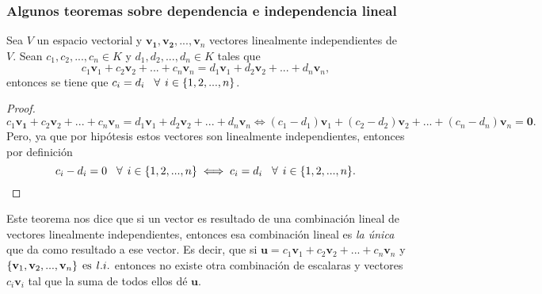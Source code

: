 \documentclass[notasLineal]{subfiles}
\begin{document}
\subsubsection*{Algunos teoremas sobre dependencia e independencia lineal} \label{Teo:Dependencia_e_independencia_lineal} 

\begin{Teo}\label{teo:Unicidad de combinación lineal en independencia lineal}

    Sea $V$ un espacio vectorial y $\mathbf{v_1}, \mathbf{v_2}, ..., \mathbf{v}_n$ vectores linealmente independientes de $V$. Sean $c_1, c_2, ..., c_n\in K$ y $d_1, d_2, ..., d_n\in K$ tales que $$c_1\mathbf{v}_1+c_2\mathbf{v}_2+...+c_n\mathbf{v}_n=d_1\mathbf{v}_1+d_2\mathbf{v}_2+...+d_n\mathbf{v}_n,$$ entonces se tiene que $c_i=d_i\hspace{3mm}\forall\hspace{1.5mm}i\in\{1,2, ..., n\}$.

    \begin{proof}

        $$c_1\mathbf{v_1}+c_2\mathbf{v}_2+...+c_n\mathbf{v}_n=d_1\mathbf{v}_1+d_2\mathbf{v}_2+...+d_n\mathbf{v}_n\iff(c_1-d_1)\mathbf{v}_1+(c_2-d_2)\mathbf{v}_2+...+(c_n-d_n)\mathbf{v}_n=\mathbf{0}.$$ Pero, ya que por hipótesis estos vectores son linealmente independientes, entonces por definición $$c_i-d_i=0\hspace{3mm}\forall\hspace{1.5mm}i\in\{1,2, ...,n\}\iff c_i=d_i\hspace{3mm}\forall\hspace{1.5mm}i\in\{1,2, ...,n\}.$$

    \end{proof}

    Este teorema nos dice que si un vector es resultado de una combinación lineal de vectores linealmente independientes, entonces esa combinación lineal es \emph{la única} que da como resultado a ese vector. Es decir, que si $\mathbf{u}=c_1\mathbf{v}_1+c_2\mathbf{v}_2+...+c_n\mathbf{v}_n$ y $\{\mathbf{v}_1,\mathbf{v}_2, ...,\mathbf{v}_n\}\hspace{1.5mm}\text{es}\hspace{1.5mm} l.i.$ entonces no existe otra combinación de escalaras y vectores $c_i \mathbf{v}_i$ tal que la suma de todos ellos dé $\mathbf{u}$.

\end{Teo}
\end{document}
